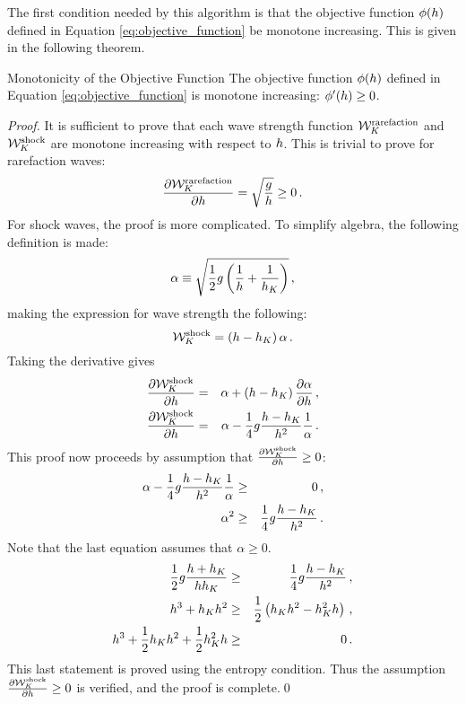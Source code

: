 The first condition needed by this algorithm is that the objective function
$\phi(h)$ defined in Equation \eqref{eq:objective_function} be monotone
increasing. This is given in the following theorem.
\begin{theorem}{Monotonicity of the Objective Function}
The objective function $\phi(h)$ defined in Equation
\eqref{eq:objective_function} is monotone increasing: $\phi'(h) \geq 0$.
\end{theorem}
\begin{proof}
It is sufficient to prove that
each wave strength function $\mathcal{W}_K^{\text{rarefaction}}$ and
$\mathcal{W}_K^{\text{shock}}$ are monotone increasing with respect to
$h$. This is trivial to prove for rarefaction waves:
\begin{equation}
  \frac{\partial \mathcal{W}_K^{\text{rarefaction}}}{\partial h} = \sqrt{\frac{g}{h}} \geq 0 \,.
\end{equation}
For shock waves, the proof is more complicated. To simplify algebra, the following
definition is made:
\begin{equation}
  \alpha \equiv \sqrt{\frac{1}{2}g\left(\frac{1}{h} + \frac{1}{h_K}\right)}
  \,,
\end{equation}
making the expression for wave strength the following:
\begin{equation}
  \mathcal{W}_K^{\text{shock}} = \left(h - h_K\right)\alpha
  \,.
\end{equation}
Taking the derivative gives
\begin{eqnarray*}
  \frac{\partial \mathcal{W}_K^{\text{shock}}}{\partial h} & = &
    \alpha + \left(h - h_K\right)\frac{\partial \alpha}{\partial h} \,,\\
  \frac{\partial \mathcal{W}_K^{\text{shock}}}{\partial h} & = &
    \alpha - \frac{1}{4}g\frac{h - h_K}{h^2}\frac{1}{\alpha}
  \,.
\end{eqnarray*}
This proof now proceeds by assumption that $\frac{\partial \mathcal{W}_K^{\text{shock}}}{\partial h}\geq0$:
\begin{eqnarray*}
  \alpha - \frac{1}{4}g\frac{h - h_K}{h^2}\frac{1}{\alpha}
    & \geq & 0 \,,\\
  \alpha^2 & \geq & \frac{1}{4}g\frac{h - h_K}{h^2} \,.
\end{eqnarray*}
Note that the last equation assumes that $\alpha\geq0$.
\begin{eqnarray*}
  \frac{1}{2}g\frac{h + h_K}{hh_K} & \geq &
    \frac{1}{4}g\frac{h - h_K}{h^2} \,,\\
  h^3 + h_Kh^2 & \geq &
    \frac{1}{2}\left(h_Kh^2 - h_K^2h\right) \,,\\
  h^3 + \frac{1}{2}h_Kh^2 + \frac{1}{2}h_K^2h & \geq & 0 \,.
\end{eqnarray*}
This last statement is proved using the entropy condition. Thus
the assumption $\frac{\partial \mathcal{W}_K^{\text{shock}}}{\partial h}\geq0$
is verified, and the proof is complete.\qed
\end{proof}

